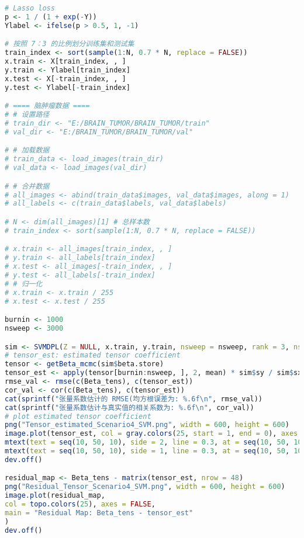 \documentclass[AutoFakeBold]{LZUThesis}
\begin{document}
\begin{lstlisting}[language=R, caption = {BT-SVM}算法]
# Lasso loss
p <- 1 / (1 + exp(-Y))
Ylabel <- ifelse(p > 0.5, 1, -1)

# 按照 7：3 的比例划分训练集和测试集
train_index <- sort(sample(1:N, 0.7 * N, replace = FALSE))
x.train <- X[train_index, , ]
y.train <- Ylabel[train_index]
x.test <- X[-train_index, , ]
y.test <- Ylabel[-train_index]

# ==== 脑肿瘤数据 ====
# # 设置路径
# train_dir <- "E:/BRAIN_TUMOR/BRAIN_TUMOR/train"
# val_dir <- "E:/BRAIN_TUMOR/BRAIN_TUMOR/val"

# # 加载数据
# train_data <- load_images(train_dir)
# val_data <- load_images(val_dir)

# # 合并数据
# all_images <- abind(train_data$images, val_data$images, along = 1)
# all_labels <- c(train_data$labels, val_data$labels)

# N <- dim(all_images)[1] # 总样本数
# train_index <- sort(sample(1:N, 0.7 * N, replace = FALSE))

# x.train <- all_images[train_index, , ]
# y.train <- all_labels[train_index]
# x.test <- all_images[-train_index, , ]
# y.test <- all_labels[-train_index]
# # 归一化
# x.train <- x.train / 255
# x.test <- x.test / 255

burnin <- 1000
nsweep <- 3000

sim <- SVMDPL(Z = NULL, x.train, y.train, nsweep = nsweep, rank = 3, nskip = nskip, scale = T)
# tensor_est: estimated tensor coefficient
tensor <- getBeta_mcmc(sim$beta.store)
tensor_est <- apply(tensor[burnin:nsweep, ], 2, mean) * sim$sy / sim$sx
rmse_val <- rmse(c(Beta_tens), c(tensor_est))
cor_val <- cor(c(Beta_tens), c(tensor_est))
cat(sprintf("张量系数估计的 RMSE(均方根误差为: %.6f\n", rmse_val))
cat(sprintf("张量系数估计与真实值的相关系数为: %.6f\n", cor_val))
# plot estimated tensor coefficient
png("Tensor_estimated_Scenario4_SVM.png", width = 600, height = 600)
image.plot(tensor_est, col = gray.colors(25, start = 1, end = 0), axes = F)
mtext(text = seq(10, 50, 10), side = 2, line = 0.3, at = seq(10, 50, 10) / 48, las = 1, cex = 0.8)
mtext(text = seq(10, 50, 10), side = 1, line = 0.3, at = seq(10, 50, 10) / 48, las = 2, cex = 0.8)
dev.off()

residual_map <- Beta_tens - matrix(tensor_est, nrow = 48)
png("Residual_Tensor_Scenario4_SVM.png", width = 600, height = 600)
image.plot(residual_map,
col = topo.colors(25), axes = FALSE,
main = "Residual Map: Beta_tens - tensor_est"
)
dev.off()


\end{lstlisting}
\end{document}
